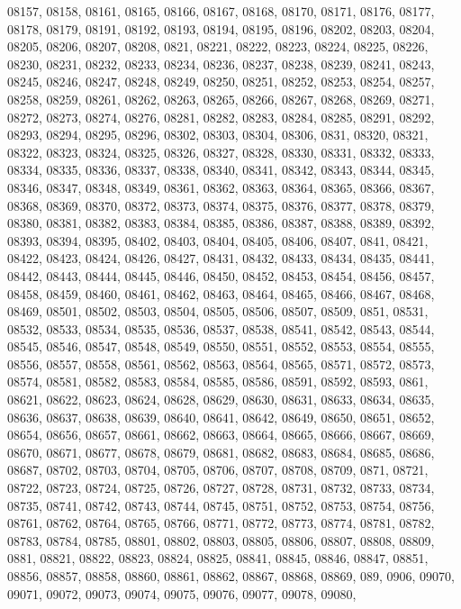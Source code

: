 {08157,
08158,
08161,
08165,
08166,
08167,
08168,
08170,
08171,
08176,
08177,
08178,
08179,
08191,
08192,
08193,
08194,
08195,
08196,
08202,
08203,
08204,
08205,
08206,
08207,
08208,
0821,
08221,
08222,
08223,
08224,
08225,
08226,
08230,
08231,
08232,
08233,
08234,
08236,
08237,
08238,
08239,
08241,
08243,
08245,
08246,
08247,
08248,
08249,
08250,
08251,
08252,
08253,
08254,
08257,
08258,
08259,
08261,
08262,
08263,
08265,
08266,
08267,
08268,
08269,
08271,
08272,
08273,
08274,
08276,
08281,
08282,
08283,
08284,
08285,
08291,
08292,
08293,
08294,
08295,
08296,
08302,
08303,
08304,
08306,
0831,
08320,
08321,
08322,
08323,
08324,
08325,
08326,
08327,
08328,
08330,
08331,
08332,
08333,
08334,
08335,
08336,
08337,
08338,
08340,
08341,
08342,
08343,
08344,
08345,
08346,
08347,
08348,
08349,
08361,
08362,
08363,
08364,
08365,
08366,
08367,
08368,
08369,
08370,
08372,
08373,
08374,
08375,
08376,
08377,
08378,
08379,
08380,
08381,
08382,
08383,
08384,
08385,
08386,
08387,
08388,
08389,
08392,
08393,
08394,
08395,
08402,
08403,
08404,
08405,
08406,
08407,
0841,
08421,
08422,
08423,
08424,
08426,
08427,
08431,
08432,
08433,
08434,
08435,
08441,
08442,
08443,
08444,
08445,
08446,
08450,
08452,
08453,
08454,
08456,
08457,
08458,
08459,
08460,
08461,
08462,
08463,
08464,
08465,
08466,
08467,
08468,
08469,
08501,
08502,
08503,
08504,
08505,
08506,
08507,
08509,
0851,
08531,
08532,
08533,
08534,
08535,
08536,
08537,
08538,
08541,
08542,
08543,
08544,
08545,
08546,
08547,
08548,
08549,
08550,
08551,
08552,
08553,
08554,
08555,
08556,
08557,
08558,
08561,
08562,
08563,
08564,
08565,
08571,
08572,
08573,
08574,
08581,
08582,
08583,
08584,
08585,
08586,
08591,
08592,
08593,
0861,
08621,
08622,
08623,
08624,
08628,
08629,
08630,
08631,
08633,
08634,
08635,
08636,
08637,
08638,
08639,
08640,
08641,
08642,
08649,
08650,
08651,
08652,
08654,
08656,
08657,
08661,
08662,
08663,
08664,
08665,
08666,
08667,
08669,
08670,
08671,
08677,
08678,
08679,
08681,
08682,
08683,
08684,
08685,
08686,
08687,
08702,
08703,
08704,
08705,
08706,
08707,
08708,
08709,
0871,
08721,
08722,
08723,
08724,
08725,
08726,
08727,
08728,
08731,
08732,
08733,
08734,
08735,
08741,
08742,
08743,
08744,
08745,
08751,
08752,
08753,
08754,
08756,
08761,
08762,
08764,
08765,
08766,
08771,
08772,
08773,
08774,
08781,
08782,
08783,
08784,
08785,
08801,
08802,
08803,
08805,
08806,
08807,
08808,
08809,
0881,
08821,
08822,
08823,
08824,
08825,
08841,
08845,
08846,
08847,
08851,
08856,
08857,
08858,
08860,
08861,
08862,
08867,
08868,
08869,
089,
0906,
09070,
09071,
09072,
09073,
09074,
09075,
09076,
09077,
09078,
09080,
}
